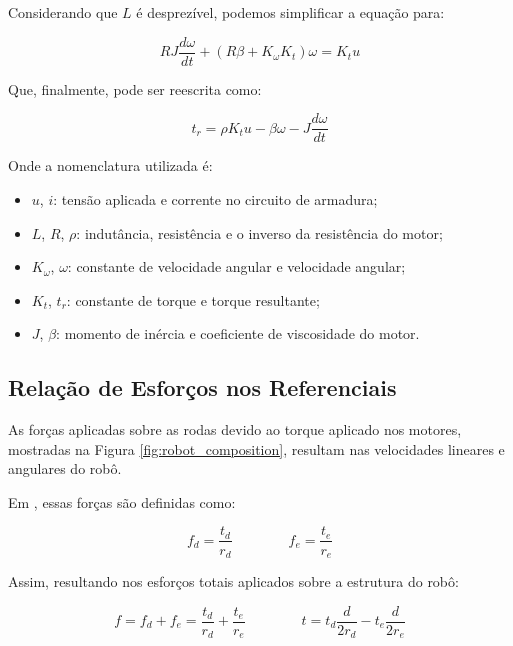 Considerando que $L$ é desprezível, podemos simplificar a equação para:

\begin{equation}
    R J \frac{d \omega}{dt} + (R \beta + K_{\omega} K_{t}) \omega = K_{t} u
\end{equation}

Que, finalmente, pode ser reescrita como:

\begin{equation}
    t_r = \rho K_{t} u - \beta \omega - J \frac{d \omega}{dt}
    \label{eq:atuadores}
\end{equation}

Onde a nomenclatura utilizada é:

\begin{itemize}
    \item $u$, $i$: tensão aplicada e corrente no circuito de armadura;
    \item $L$, $R$, $\rho$: indutância, resistência e o inverso da resistência do motor;
    \item $K_{\omega}$, $\omega$: constante de velocidade angular e velocidade angular;
    \item $K_{t}$, $t_r$: constante de torque e torque resultante;
    \item $J$, $\beta$: momento de inércia e coeficiente de viscosidade do motor.
\end{itemize}

\subsection{Relação de Esforços nos Referenciais}

As forças aplicadas sobre as rodas devido ao torque aplicado nos motores, 
mostradas na Figura \ref{fig:robot_composition}, resultam 
nas velocidades lineares e angulares do robô. 

Em \cite{vieira2005controle}, essas forças são definidas como:

\begin{equation}
f_d = \frac{t_d}{r_d}
\qquad
\qquad
f_e = \frac{t_e}{r_e}
\end{equation}

Assim, resultando nos esforços totais aplicados sobre a estrutura do robô:

\begin{equation}
f = f_d + f_e = \frac{t_d}{r_d} + \frac{t_e}{r_e}
\qquad
\qquad
t = t_d \frac{d}{2r_d} - t_e \frac{d}{2r_e}
\label{eq:esforco}
\end{equation}

